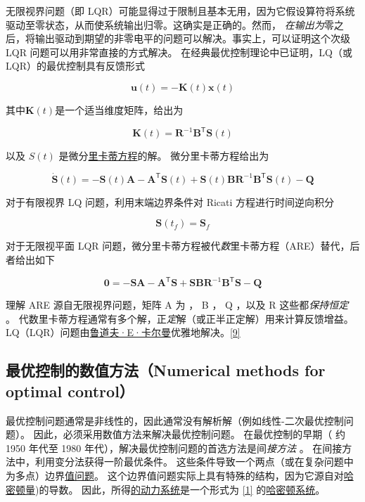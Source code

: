 无限视界问题（即 LQR）可能显得过于限制且基本无用，因为它假设算符将系统驱动至零状态，从而使系统输出归零。这确实是正确的。然而， \emph{在输出为}零之后，将输出驱动到期望的非零电平的问题可以解决。事实上，可以证明这个次级 LQR 问题可以用非常直接的方式解决。 在经典最优控制理论中已证明，LQ（或 LQR）的最优控制具有反馈形式

\[
{\displaystyle \mathbf {u} (t)=-\mathbf {K} (t)\mathbf {x} (t)}
\]

其中\({\displaystyle \mathbf {K} (t)}\)是一个适当维度矩阵，给出为

\[
{\displaystyle \mathbf {K} (t)=\mathbf {R} ^{-1}\mathbf {B} ^{\mathsf {T}}\mathbf {S} (t)}
\]

以及 \(S ( t )\) 是微分\href{https://en.wikipedia.org/wiki/Riccati_equation}{里卡蒂方程}的解。 微分里卡蒂方程给出为

\[
{\displaystyle {\dot {\mathbf {S} }}(t)=-\mathbf {S} (t)\mathbf {A} -\mathbf {A} ^{\mathsf {T}}\mathbf {S} (t)+\mathbf {S} (t)\mathbf {B} \mathbf {R} ^{-1}\mathbf {B} ^{\mathsf {T}}\mathbf {S} (t)-\mathbf {Q} }
\]

对于有限视界 LQ 问题，利用末端边界条件对 Ricati 方程进行时间逆向积分

\[
{\displaystyle \mathbf {S} (t_{f})=\mathbf {S} _{f}}
\]

对于无限视平面 LQR 问题，微分里卡蒂方程被代\emph{数}里卡蒂方程（ARE）替代，后者给出如下

\[
{\displaystyle \mathbf {0} =-\mathbf {S} \mathbf {A} -\mathbf {A} ^{\mathsf {T}}\mathbf {S} +\mathbf {S} \mathbf {B} \mathbf {R} ^{-1}\mathbf {B} ^{\mathsf {T}}\mathbf {S} -\mathbf {Q} }
\]

理解 ARE 源自无限视界问题，矩阵 A 为 ， B ， Q ，以及 R 这些都\emph{保持恒定} 。 代数里卡蒂方程通常有多个解，正\emph{定}解（或正半正定解）用来计算反馈增益。 LQ（LQR）问题由\href{https://en.wikipedia.org/wiki/Rudolf_E._Kálmán}{鲁道夫·E·卡尔曼}优雅地解决。\href{https://en.wikipedia.org/wiki/Optimal_control#cite_note-9}{[9]}

\subsection{最优控制的数值方法（Numerical methods for optimal control）}

最优控制问题通常是非线性的，因此通常没有解析解（例如线性-二次最优控制问题）。 因此，必须采用数值方法来解决最优控制问题。 在最优控制的早期（ 约 1950 年代至 1980 年代），解决最优控制问题的首选方法是间\emph{接方法} 。 在间接方法中，利用变分法获得一阶最优条件。 这些条件导致一个两点（或在复杂问题中为多点）边界\href{https://en.wikipedia.org/wiki/Boundary-value_problem}{值问题}。 这个边界值问题实际上具有特殊的结构，因为它源自对\href{https://en.wikipedia.org/wiki/Hamiltonian_(control_theory}{哈密顿量})的导数。 因此，所得\href{https://en.wikipedia.org/wiki/Dynamical_system}{的动力系统}是一个形式为 \href{https://en.wikipedia.org/wiki/Optimal_control#cite_note-:0-1}{[1]} 的\href{https://en.wikipedia.org/wiki/Hamiltonian_system}{哈密顿系统}。

